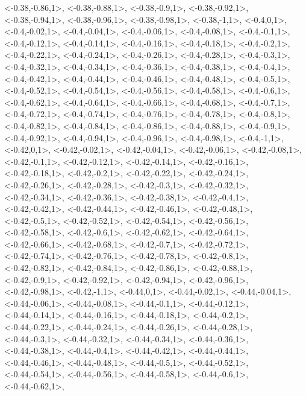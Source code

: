 \documentclass[a4paper,10pt]{article}
\begin{document}
\begin{eulernotebook}
\begin{euleroutput}
  <-0.38,-0.86,1>,
  <-0.38,-0.88,1>,
  <-0.38,-0.9,1>,
  <-0.38,-0.92,1>,
  <-0.38,-0.94,1>,
  <-0.38,-0.96,1>,
  <-0.38,-0.98,1>,
  <-0.38,-1,1>,
  <-0.4,0,1>,
  <-0.4,-0.02,1>,
  <-0.4,-0.04,1>,
  <-0.4,-0.06,1>,
  <-0.4,-0.08,1>,
  <-0.4,-0.1,1>,
  <-0.4,-0.12,1>,
  <-0.4,-0.14,1>,
  <-0.4,-0.16,1>,
  <-0.4,-0.18,1>,
  <-0.4,-0.2,1>,
  <-0.4,-0.22,1>,
  <-0.4,-0.24,1>,
  <-0.4,-0.26,1>,
  <-0.4,-0.28,1>,
  <-0.4,-0.3,1>,
  <-0.4,-0.32,1>,
  <-0.4,-0.34,1>,
  <-0.4,-0.36,1>,
  <-0.4,-0.38,1>,
  <-0.4,-0.4,1>,
  <-0.4,-0.42,1>,
  <-0.4,-0.44,1>,
  <-0.4,-0.46,1>,
  <-0.4,-0.48,1>,
  <-0.4,-0.5,1>,
  <-0.4,-0.52,1>,
  <-0.4,-0.54,1>,
  <-0.4,-0.56,1>,
  <-0.4,-0.58,1>,
  <-0.4,-0.6,1>,
  <-0.4,-0.62,1>,
  <-0.4,-0.64,1>,
  <-0.4,-0.66,1>,
  <-0.4,-0.68,1>,
  <-0.4,-0.7,1>,
  <-0.4,-0.72,1>,
  <-0.4,-0.74,1>,
  <-0.4,-0.76,1>,
  <-0.4,-0.78,1>,
  <-0.4,-0.8,1>,
  <-0.4,-0.82,1>,
  <-0.4,-0.84,1>,
  <-0.4,-0.86,1>,
  <-0.4,-0.88,1>,
  <-0.4,-0.9,1>,
  <-0.4,-0.92,1>,
  <-0.4,-0.94,1>,
  <-0.4,-0.96,1>,
  <-0.4,-0.98,1>,
  <-0.4,-1,1>,
  <-0.42,0,1>,
  <-0.42,-0.02,1>,
  <-0.42,-0.04,1>,
  <-0.42,-0.06,1>,
  <-0.42,-0.08,1>,
  <-0.42,-0.1,1>,
  <-0.42,-0.12,1>,
  <-0.42,-0.14,1>,
  <-0.42,-0.16,1>,
  <-0.42,-0.18,1>,
  <-0.42,-0.2,1>,
  <-0.42,-0.22,1>,
  <-0.42,-0.24,1>,
  <-0.42,-0.26,1>,
  <-0.42,-0.28,1>,
  <-0.42,-0.3,1>,
  <-0.42,-0.32,1>,
  <-0.42,-0.34,1>,
  <-0.42,-0.36,1>,
  <-0.42,-0.38,1>,
  <-0.42,-0.4,1>,
  <-0.42,-0.42,1>,
  <-0.42,-0.44,1>,
  <-0.42,-0.46,1>,
  <-0.42,-0.48,1>,
  <-0.42,-0.5,1>,
  <-0.42,-0.52,1>,
  <-0.42,-0.54,1>,
  <-0.42,-0.56,1>,
  <-0.42,-0.58,1>,
  <-0.42,-0.6,1>,
  <-0.42,-0.62,1>,
  <-0.42,-0.64,1>,
  <-0.42,-0.66,1>,
  <-0.42,-0.68,1>,
  <-0.42,-0.7,1>,
  <-0.42,-0.72,1>,
  <-0.42,-0.74,1>,
  <-0.42,-0.76,1>,
  <-0.42,-0.78,1>,
  <-0.42,-0.8,1>,
  <-0.42,-0.82,1>,
  <-0.42,-0.84,1>,
  <-0.42,-0.86,1>,
  <-0.42,-0.88,1>,
  <-0.42,-0.9,1>,
  <-0.42,-0.92,1>,
  <-0.42,-0.94,1>,
  <-0.42,-0.96,1>,
  <-0.42,-0.98,1>,
  <-0.42,-1,1>,
  <-0.44,0,1>,
  <-0.44,-0.02,1>,
  <-0.44,-0.04,1>,
  <-0.44,-0.06,1>,
  <-0.44,-0.08,1>,
  <-0.44,-0.1,1>,
  <-0.44,-0.12,1>,
  <-0.44,-0.14,1>,
  <-0.44,-0.16,1>,
  <-0.44,-0.18,1>,
  <-0.44,-0.2,1>,
  <-0.44,-0.22,1>,
  <-0.44,-0.24,1>,
  <-0.44,-0.26,1>,
  <-0.44,-0.28,1>,
  <-0.44,-0.3,1>,
  <-0.44,-0.32,1>,
  <-0.44,-0.34,1>,
  <-0.44,-0.36,1>,
  <-0.44,-0.38,1>,
  <-0.44,-0.4,1>,
  <-0.44,-0.42,1>,
  <-0.44,-0.44,1>,
  <-0.44,-0.46,1>,
  <-0.44,-0.48,1>,
  <-0.44,-0.5,1>,
  <-0.44,-0.52,1>,
  <-0.44,-0.54,1>,
  <-0.44,-0.56,1>,
  <-0.44,-0.58,1>,
  <-0.44,-0.6,1>,
  <-0.44,-0.62,1>,

\end{euleroutput}
\end{eulernotebook}
\end{document}
